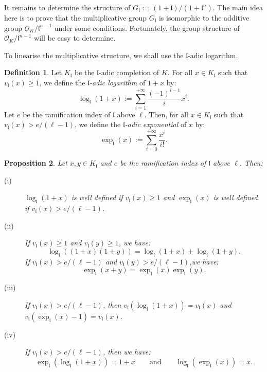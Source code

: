 \documentclass[a4paper,10pt,notitlepage]{report}
\theoremstyle{definition}
\newtheorem{Definition}{Definition}[chapter]
\theoremstyle{plain}
\newtheorem{Proposition}[Definition]{Proposition}
\theoremstyle{definition}
\newcommand{\mO}{\mathcal{O}}
\renewcommand{\(}{\left(}
\renewcommand{\)}{\right)}
\newcommand{\mf}[1]{\mathfrak{#1}}
\begin{document}
It remains to determine the structure of $G_{\mf{l}}:=(1+\mf{l})/(1+\mf{l}^n)$. The main idea here is to prove that the multiplicative group $G_{\mf{l}}$ is isomorphic to the additive group $\mO_K/\mf{l}^{n-1}$ under some conditions.  Fortunately, the group structure of $\mO_K/\mf{l}^{n-1}$ will be easy to determine. 

To linearise the multiplicative structure, we shall use the $\mf{l}$-adic logarithm.

\begin{Definition}
Let $K_{\mf{l}}$ be the $\mf{l}$-adic completion of $K$. For all $x\in K_{\mf{l}}$ such that $v_{\mf{l}}(x)\geq 1$, we define the \emph{$\mf{l}$-adic logarithm} of $1+x$ by:
\[\log_{\mf{l}}(1+x):=\sum_{i=1}^{+\infty} \frac{(-1)^{i-1}}{i}x^i.\]
Let $e$ be the ramification index of $\mf{l}$ above $\ell$. Then, for all $x\in K_{\mf{l}}$ such that $v_{\mf{l}}(x)>e/(\ell-1)$, we define the \emph{$\mf{l}$-adic exponential} of $x$ by:
\[\exp_{\mf{l}}(x):=\sum_{i=0}^{+\infty}\frac{x^i}{i!}.\]
\end{Definition}

\begin{Proposition}
Let $x, y\in K_{\mf{l}}$ and $e$ be the ramification index of $\mf{l}$ above $\ell$. Then:

\begin{description}
\item[(i)] $\log_{\mf{l}}(1+x)$ is well defined if $v_{\mf{l}}(x)\geq 1$ and $\exp_{\mf{l}}(x)$ is well defined if $v_{\mf{l}}(x)>e/(\ell-1)$.
\item[(ii)] If $v_{\mf{l}}(x)\geq 1$ and $v_{\mf{l}}(y)\geq 1$, we have:
\[\log_{\mf{l}}((1+x)(1+y))=\log_{\mf{l}}(1+x)+\log_{\mf{l}}(1+y).\]
If $v_{\mf{l}}(x)> e/(\ell-1)$ and $v_{\mf{l}}(y)>e/(\ell-1)$,we have:
\[\exp_{\mf{l}}(x+y)=\exp_{\mf{l}}(x)\exp_{\mf{l}}(y).\]
\item[(iii)] If $v_{\mf{l}}(x)>e/(\ell-1)$, then $v_{\mf{l}}(\log_{\mf{l}}(1+x))=v_{\mf{l}}(x)$ and $v_{\mf{l}}(\exp_{\mf{l}}(x)-1)=v_{\mf{l}}(x)$.
\item[(iv)] If $v_{\mf{l}}(x)> e/(\ell-1)$, then we have:
\[\exp_{\mf{l}}(\log_{\mf{l}}(1+x))=1+x \qquad \mbox{and} \qquad \log_{\mf{l}}(\exp_{\mf{l}}(x))=x.\]
\end{description}
\end{Proposition}
\end{document}
